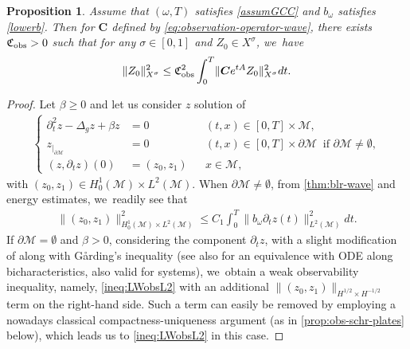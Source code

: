 \documentclass[JEP,XML,SOM,Unicode,published]{cedram}
\newtheorem{proposition}[theorem]{Proposition}
\theoremstyle{definition}
\let\mc\mathcal
\newcommand{\M}{\mc{M}}
\newcommand{\bC}{\boldsymbol{C}}
\providecommand{\norm}[1]{\lVert#1\rVert}
\begin{document}
\begin{proposition}\label{prop:higher-reg-obs}
Assume that $(\omega, T)$ satisfies \ref{assumGCC} and $b_{\omega}$ satisfies \eqref{lowerb}. Then for $\bC$ defined by \eqref{eq:observation-operator-wave}, there exists $\mathfrak{C}_{\textup{obs}}>0$ such that for any $\sigma\in [0,1]$ and $Z_0\in X^\sigma$, we~have
\begin{align}\label{thm:ineq:LWobshigh}
\norm{Z_0}_{X^\sigma}^2\leq \mathfrak{C}_{\textup{obs}}^2\int_0^T \norm{\bC e^{tA}Z_0}_{X^\sigma}^2 dt.
\end{align}
\end{proposition}
\begin{proof}
Let $\beta\geq 0$ and let us consider $z$ solution of
\begin{align}\label{eq:LWbeta}
\left\{\begin{aligned}
\partial_t^2 z-\Delta_g z+\beta z&=0 &&(t, x)\in [0, T]\times\M,\\
z_{|_{\partial\M}}&=0 &&(t, x)\in [0, T]\times\partial\M\ \text{ if } \partial\M\neq\emptyset,\\
(z, \partial_t z)(0)&=(z_0, z_1) &&x\in \M,
\end{aligned}\right.
\end{align}
with $(z_0, z_1)\in H_0^1(\M)\times L^2(\M)$. When $\partial\M\neq\emptyset$, from \cref{thm:blr-wave} and energy estimates, we~readily see that
\begin{align}\label{ineq:LWobsL2}
\norm{(z_0, z_1)}_{H_0^1(\M)\times L^2(\M)}^2\leq C_1\int_0^T \norm{b_\omega\partial_t z(t)}_{L^2(\M)}^2 dt.
\end{align}
If $\partial\M=\emptyset$ and $\beta>0$, considering the component $\partial_t z$, with a slight modification of \cite[Prop.\,2.2]{LL16} along with G{\aa}rding's inequality \cite[Th.\,A.9]{LL16} (see also \cite[Th.\,1.3]{CLW:20} for an equivalence with ODE along bicharacteristics, also valid for systems), we~obtain a weak observability inequality, namely, \eqref{ineq:LWobsL2} with an additional $\norm{(z_0, z_1)}_{H^{1/2}\times H^{-1/2}}$ term on the right-hand side. Such a term can easily be removed by employing a nowadays classical compactness-uniqueness argument (as in \cref{prop:obs-schr-plates} below), which leads us to \eqref{ineq:LWobsL2} in this case.


\end{proof}
\end{document}

